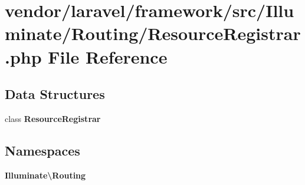\section{vendor/laravel/framework/src/\+Illuminate/\+Routing/\+Resource\+Registrar.php File Reference}
\label{_resource_registrar_8php}
\subsection*{Data Structures}
\begin{DoxyCompactItemize}
\item 
class {\bf Resource\+Registrar}
\end{DoxyCompactItemize}
\subsection*{Namespaces}
\begin{DoxyCompactItemize}
\item 
 {\bf Illuminate\textbackslash{}\+Routing}
\end{DoxyCompactItemize}
